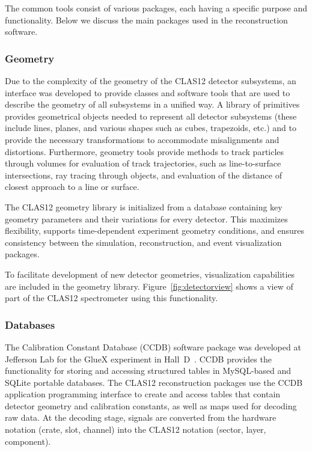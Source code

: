 The common tools consist of various packages, each having a specific purpose and functionality. Below we discuss
the main packages used in the reconstruction software.

\subsubsection{Geometry}

Due to the complexity of the geometry of the CLAS12 detector subsystems, an interface was developed to provide
classes and software tools that are used to describe the geometry of all subsystems in a unified way.  A library of
primitives provides geometrical objects needed to represent all detector subsystems (these include lines, planes,
and various shapes such as cubes, trapezoids, etc.) and to provide the necessary transformations to accommodate
misalignments and distortions.  Furthermore, geometry tools provide methods to track particles through volumes for
evaluation of track trajectories, such as line-to-surface intersections, ray tracing through objects, and evaluation of
the distance of closest approach to a line or surface.

The CLAS12 geometry library is initialized from a database containing key geometry parameters and their
variations for every detector.  This maximizes flexibility, supports time-dependent experiment geometry
conditions, and ensures consistency between the simulation, reconstruction, and event visualization packages.

To facilitate development of new detector geometries, visualization capabilities are included in the geometry library.
Figure~\ref{fig:detectorview} shows a view of part of the CLAS12 spectrometer using this functionality.

\subsubsection{Databases}

The Calibration Constant Database (CCDB) software package was developed at Jefferson Lab for the GlueX
experiment in Hall~D~\cite{gluex}.  CCDB provides the functionality for storing and accessing structured tables in
MySQL-based and SQLite portable databases. The CLAS12 reconstruction packages use the CCDB application
programming interface to create and access tables that contain detector geometry and calibration constants, as
well as maps used for decoding raw data. At the decoding stage, signals are converted from the hardware notation
(crate, slot, channel) into the CLAS12 notation (sector, layer, component). 

